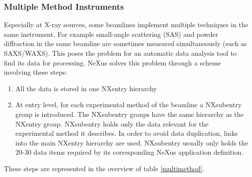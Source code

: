 \documentclass[%
 aip,
rsi,
 amsmath,amssymb,
 reprint,%
]{revtex4-1}
\begin{document}
\subsubsection{Multiple Method Instruments}

Especially at X-ray sources, some beamlines implement multiple techniques in the same instrument. 
For example small-angle scattering (SAS) and powder diffraction in the same beamline are sometimes measured 
simultaneously (such as SAXS/WAXS). This poses the problem for an automatic data analysis tool to find its data 
for processing.  NeXus solves this problem through a scheme involving these steps:
\begin{enumerate}
\item All the data is stored in one NXentry hierarchy
\item At entry level, for each experimental method of the beamline a NXsubentry group is introduced. The 
  NXsubentry groups have the same hierarchy as the  NXentry group. NXsubentry holds only the data relevant 
  for the experimental method it describes. In order to avoid data duplication, links into the main NXentry 
  hierarchy are used. 
  NXsubentry usually only holds the 20-30 data items required by its corresponding NeXus 
  application definition.  
\end{enumerate} 
These steps are represented in the overview of table \ref{multimethod}.
\end{document}

